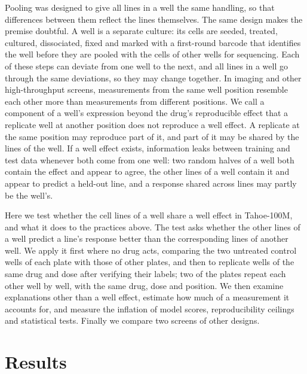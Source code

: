 \documentclass[pdflatex,sn-nature]{sn-jnl}
\begin{document}
Pooling was designed to give all lines in a well the same handling, so that differences between them reflect the lines themselves\cite{mcfarland2020}. The same design makes the premise doubtful. A well is a separate culture: its cells are seeded, treated, cultured, dissociated, fixed and marked with a first-round barcode that identifies the well before they are pooled with the cells of other wells for sequencing. Each of these steps can deviate from one well to the next, and all lines in a well go through the same deviations, so they may change together. In imaging and other high-throughput screens, measurements from the same well position resemble each other more than measurements from different positions\cite{mazoure2017,kalinin2025}. We call a component of a well's expression beyond the drug's reproducible effect that a replicate well at another position does not reproduce a well effect. A replicate at the same position may reproduce part of it, and part of it may be shared by the lines of the well. If a well effect exists, information leaks between training and test data whenever both come from one well: two random halves of a well both contain the effect and appear to agree, the other lines of a well contain it and appear to predict a held-out line, and a response shared across lines may partly be the well's.

Here we test whether the cell lines of a well share a well effect in Tahoe-100M, and what it does to the practices above. The test asks whether the other lines of a well predict a line's response better than the corresponding lines of another well. We apply it first where no drug acts, comparing the two untreated control wells of each plate with those of other plates, and then to replicate wells of the same drug and dose after verifying their labels; two of the plates repeat each other well by well, with the same drug, dose and position. We then examine explanations other than a well effect, estimate how much of a measurement it accounts for, and measure the inflation of model scores, reproducibility ceilings and statistical tests. Finally we compare two screens of other designs.

\section{Results}
\end{document}
